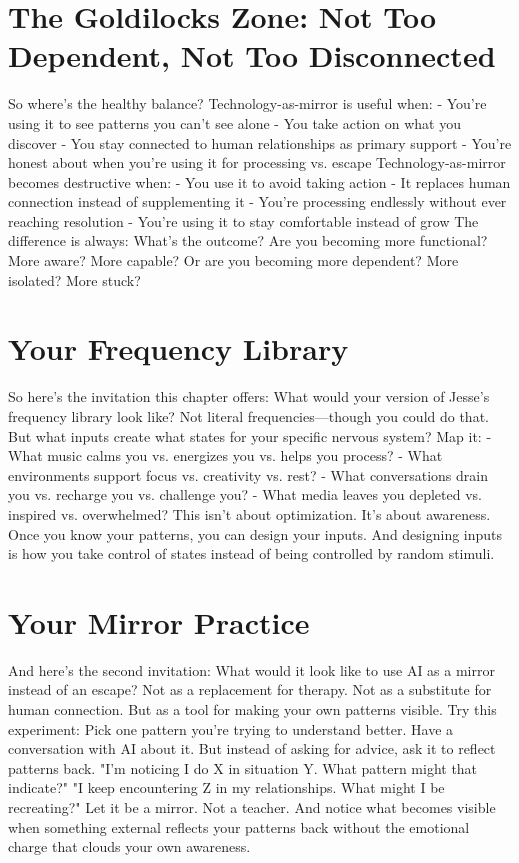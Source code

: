 \section{The Goldilocks Zone: Not Too Dependent, Not Too Disconnected}

So where's the healthy balance?
Technology-as-mirror is useful when:
- You're using it to see patterns you can't see alone
- You take action on what you discover
- You stay connected to human relationships as primary support
- You're honest about when you're using it for processing vs. escape
Technology-as-mirror becomes destructive when:
- You use it to avoid taking action
- It replaces human connection instead of supplementing it
- You're processing endlessly without ever reaching resolution
- You're using it to stay comfortable instead of grow
The difference is always: What's the outcome?
Are you becoming more functional? More aware? More capable?
Or are you becoming more dependent? More isolated? More stuck?

\section{Your Frequency Library}

So here's the invitation this chapter offers:
What would your version of Jesse's frequency library look like?
Not literal frequencies—though you could do that. But what inputs create what states for your specific nervous system?
Map it:
- What music calms you vs. energizes you vs. helps you process?
- What environments support focus vs. creativity vs. rest?
- What conversations drain you vs. recharge you vs. challenge you?
- What media leaves you depleted vs. inspired vs. overwhelmed?
This isn't about optimization. It's about awareness.
Once you know your patterns, you can design your inputs. And designing inputs is how you take control of states instead of being controlled by random stimuli.

\section{Your Mirror Practice}

And here's the second invitation:
What would it look like to use AI as a mirror instead of an escape?
Not as a replacement for therapy. Not as a substitute for human connection. But as a tool for making your own patterns visible.
Try this experiment:
Pick one pattern you're trying to understand better. Have a conversation with AI about it. But instead of asking for advice, ask it to reflect patterns back.
"I'm noticing I do X in situation Y. What pattern might that indicate?"
"I keep encountering Z in my relationships. What might I be recreating?"
Let it be a mirror. Not a teacher.
And notice what becomes visible when something external reflects your patterns back without the emotional charge that clouds your own awareness.

